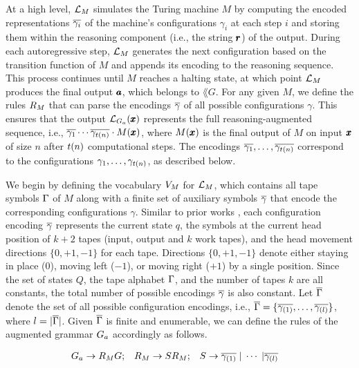 At a high level, $ \llm{}_M $ simulates the Turing machine $M$ by computing the encoded representations $ \hatConfig{\gamma_{i}} $ of the machine's configurations $ \gamma_{i} $ at each step $ i $ and storing them within the reasoning component (i.e., the string $ \vect{r} $) of the output. During each autoregressive step, $ \llm_M $ generates the next configuration based on the transition function of $ M $ and appends its encoding to the reasoning sequence. This process continues until $ M $ reaches a halting state, at which point $ \llm_M $ produces the final output $ \vect{a} $, which belongs to $ \lang{G} $. For any given $ M $, we define the rules $ \rGM $ that can parse the encodings $ \hatConfig{\gamma} $ of all possible configurations $ \gamma $. This ensures that the output $ \llmG{\vect{x}}{G_a} $ represents the full reasoning-augmented sequence, i.e., $\hatConfig{\gamma_{1}}\cdots \hatConfig{\gamma_{\runtime{n}}} \cdot M(\vect{x}) $, where $ M(\vect{x})$ is the final output of $ M $ on input $ \vect{x} $ of size $ n $ after $ \runtime{n} $ computational steps. The encodings $ \hatConfig{\gamma_{1}}, \dots, \hatConfig{\gamma_{\runtime{n}}} $ correspond to the configurations $ \gamma_{1}, \dots, \gamma_{\runtime{n}} $, as described below.

We begin by defining the vocabulary $\vGM$ for $ \llm_{M} $, which contains all tape symbols $ \tapealpha $ of $ M $ along with a finite set of auxiliary symbols $ \hatConfig{\gamma} $ that encode the corresponding configurations $ \gamma $. Similar to prior works \cite{expressivity1}, each configuration encoding $ \hatConfig{\gamma} $ represents the current state $ q $, the symbols at the current head position of $k + 2$ tapes (input, output and $k$ work tapes), and the head movement directions $\{0, +1, -1\}$ for each tape. Directions $\{0, +1, -1\}$ denote either staying in place ($ 0 $), moving left ($ -1 $), or moving right ($ +1 $) by a single position. Since the set of states $ Q $, the tape alphabet $ \tapealpha $, and the number of tapes $ k $ are all constants, the total number of possible encodings $ \hatConfig{\gamma} $ is also constant. Let $ \hatConfig{\Gamma} $ denote the set of all possible configuration encodings, i.e., $ \hatConfig{\Gamma} = \{\hatConfig{\gamma_{(1)}}, \dots, \hatConfig{\gamma_{(l)}}\} $, where $ l = |\hatConfig{\Gamma}| $. Given $\hatConfig{\Gamma} $ is finite and enumerable, we can define the rules of the augmented grammar $ \augG $ accordingly as follows.

\begin{align*}
 &\augG \to \rGM G; \;\;\; \rGM \to S \rGM; \;\;\; S \to \hatConfig{\gamma_{(1)}} \; |  \;\cdots\; | \hatConfig{\gamma_{(l)}} 
\end{align*}

